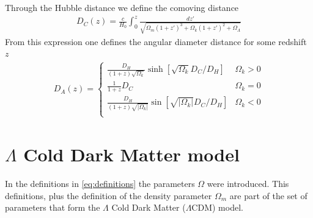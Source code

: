 Through the Hubble distance we define the comoving distance 
\begin{align}
	D_C(z) = \frac{c}{H_0}\int_{0}^{z} \frac{dz'}{\sqrt{\Omega_m(1+z')^3 + \Omega_k(1+z')^2 + \Omega_\Lambda} } 
\end{align}
From this expression one defines the angular diameter distance for some redshift $z$
\begin{align}
	D_A(z) = \begin{cases}
		\frac{D_H}{\left( 1+z \right) \sqrt{\Omega_k} }\sinh \left[ \sqrt{\Omega_k} D_C /D_H \right]  	 &\Omega_k >0\\
		\frac{1}{1+z}D_C& \Omega_k =  0\\
		\frac{D_H}{\left( 1+z \right) \sqrt{|\Omega_k|}} \sin \left[ \sqrt{|\Omega_k|} D_C /D_H \right]  	 &\Omega_k <0\\
	\end{cases}
\end{align}

\section{$\Lambda$ Cold Dark Matter model}
\label{sec:LCDM}

In the definitions in \eqref{eq:definitions} the parameters $\Omega$ were introduced. This definitions, plus the definition of the density parameter $\Omega_m$ are part of the set of parameters that form the $\Lambda$ Cold Dark Matter ($\Lambda$CDM) model. \\

